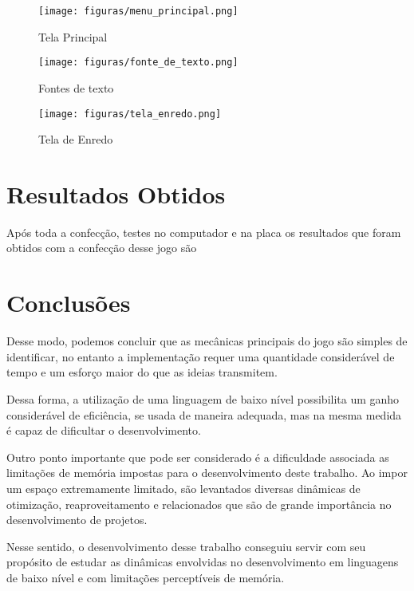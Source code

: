 \documentclass[11pt, twocolumn]{extarticle}
\begin{document}
\begin{figure}[H]
	\centering
	\texttt{[image: figuras/menu\_principal.png]}
	\caption{Tela Principal}
	\label{image: Tela Principal}
\end{figure}

\begin{figure}[H]
	\centering
	\texttt{[image: figuras/fonte\_de\_texto.png]}
	\caption{Fontes de texto}
	\label{image: Fontes de texto}
\end{figure}

\begin{figure}[H]
	\centering
	\texttt{[image: figuras/tela\_enredo.png]}
	\caption{Tela de Enredo}
	\label{image: Tela de Enredo}
\end{figure}


\section{Resultados Obtidos}
\indent \indent Após toda a confecção, testes no computador e na placa os resultados que foram obtidos com a confecção desse jogo são 

\section{Conclusões}
\indent \indent Desse modo, podemos concluir que as mecânicas principais do jogo são simples de identificar, no entanto a implementação requer uma quantidade considerável de tempo e um esforço maior do que as ideias transmitem.

Dessa forma, a utilização de uma linguagem de baixo nível possibilita um ganho considerável de eficiência, se usada de maneira adequada, mas na mesma medida é capaz de dificultar o desenvolvimento. 

Outro ponto importante que pode ser considerado é a dificuldade associada as limitações de memória impostas para o desenvolvimento deste trabalho. Ao impor um espaço extremamente limitado, são levantados diversas dinâmicas de otimização, reaproveitamento e relacionados que são de grande importância no desenvolvimento de projetos. 

Nesse sentido, o desenvolvimento desse trabalho conseguiu servir com seu propósito de estudar as dinâmicas envolvidas no desenvolvimento em linguagens de baixo nível e com limitações perceptíveis de memória.

\begin{thebibliography}{3}
\end{thebibliography}
		
\end{document}
